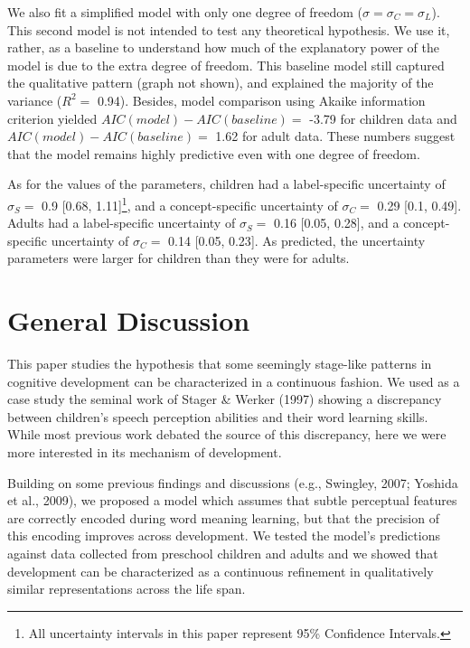 \documentclass[10pt, letterpaper]{article}
\begin{document}
We also fit a simplified model with only one degree of freedom
(\(\sigma = \sigma_C =\sigma_L\)). This second model is not intended to
test any theoretical hypothesis. We use it, rather, as a baseline to
understand how much of the explanatory power of the model is due to the
extra degree of freedom. This baseline model still captured the
qualitative pattern (graph not shown), and explained the majority of the
variance (\(R^2=\) 0.94). Besides, model comparison using Akaike
information criterion yielded \(AIC(model) - AIC(baseline) =\) -3.79 for
children data and \(AIC(model) - AIC(baseline) =\) 1.62 for adult data.
These numbers suggest that the model remains highly predictive even with
one degree of freedom.

As for the values of the parameters, children had a label-specific
uncertainty of \(\sigma_S =\) 0.9 {[}0.68,
1.11{]}\footnote{All uncertainty intervals in this paper represent 95\% Confidence Intervals.},
and a concept-specific uncertainty of \(\sigma_C =\) 0.29 {[}0.1,
0.49{]}. Adults had a label-specific uncertainty of \(\sigma_S =\) 0.16
{[}0.05, 0.28{]}, and a concept-specific uncertainty of \(\sigma_C =\)
0.14 {[}0.05, 0.23{]}. As predicted, the uncertainty parameters were
larger for children than they were for adults.

\section{General Discussion}\label{general-discussion}

This paper studies the hypothesis that some seemingly stage-like
patterns in cognitive development can be characterized in a continuous
fashion. We used as a case study the seminal work of Stager \& Werker
(1997) showing a discrepancy between children's speech perception
abilities and their word learning skills. While most previous work
debated the source of this discrepancy, here we were more interested in
its mechanism of development.

Building on some previous findings and discussions (e.g., Swingley,
2007; Yoshida et al., 2009), we proposed a model which assumes that
subtle perceptual features are correctly encoded during word meaning
learning, but that the precision of this encoding improves across
development. We tested the model's predictions against data collected
from preschool children and adults and we showed that development can be
characterized as a continuous refinement in qualitatively similar
representations across the life span.
\end{document}

